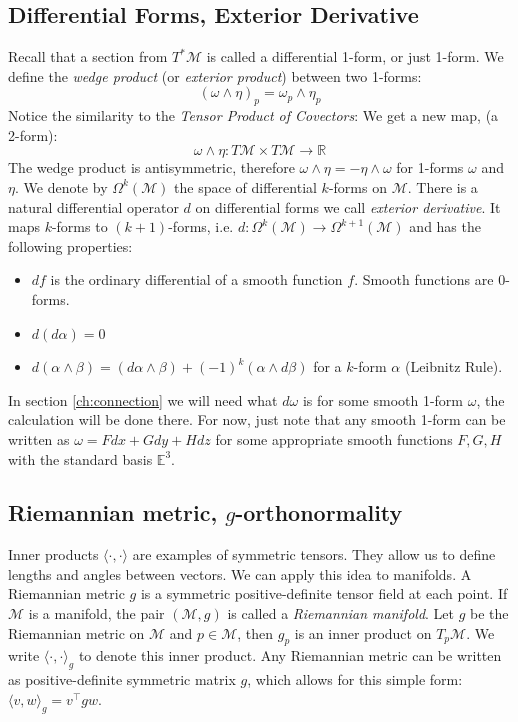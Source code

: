 \documentclass[../thesis.tex]{subfiles}
\begin{document}
\subsection{Differential Forms, Exterior Derivative}
Recall that a section from $T^*\mathcal{M}$ is called a differential 1-form, or just 1-form.
We define the \emph{wedge product} (or \emph{exterior product}) between two 1-forms:
$$(\omega \wedge \eta)_p = \omega_p \wedge \eta_p$$
Notice the similarity to the \emph{Tensor Product of Covectors}: We get a new map, (a 2-form):
$$\omega \wedge \eta: T\mathcal{M} \times T\mathcal{M} \to \mathbb{R}$$
The wedge product is antisymmetric, therefore $\omega \wedge \eta = -\eta \wedge \omega$ for 1-forms $\omega$ and $\eta$.
We denote by $\Omega^k(\mathcal{M})$ the space of differential $k$-forms on $\mathcal{M}$.
There is a natural differential operator $d$ on differential forms we call \emph{exterior derivative}.
It maps $k$-forms to $(k+1)$-forms, i.e. $d: \Omega^k(\mathcal{M}) \to \Omega^{k+1}(\mathcal{M})$
and has the following properties:
\begin{itemize}
  \item $df$ is the ordinary differential of a smooth function $f$. Smooth functions are 0-forms.
  \item $d(d\alpha) = 0$
  \item $d(\alpha \wedge \beta) = (d\alpha \wedge \beta) + (-1)^k(\alpha \wedge d\beta)$ for a $k$-form $\alpha$ (Leibnitz Rule).
\end{itemize}
In section \ref{ch:connection} we will need what $d\omega$ is for some smooth 1-form $\omega$, the calculation
will be done there. For now, just note that 
any smooth 1-form can be written as $\omega = Fdx+Gdy+Hdz$ for some appropriate smooth functions $F,G,H$
with the standard basis $\mathbb{E}^3$.


\subsection{Riemannian metric, $g$-orthonormality}
Inner products $\langle \cdot , \cdot \rangle$ are examples of symmetric tensors. They allow us to define lengths and angles
between vectors. We can apply this idea to manifolds.
A Riemannian metric $g$ is a symmetric positive-definite tensor field at each point.
If $\mathcal{M}$ is a manifold, the pair $(\mathcal{M},g)$ is called a \emph{Riemannian manifold}.
Let $g$ be the Riemannian metric on $\mathcal{M}$ and $p\in \mathcal{M}$,
then $g_p$ is an inner product on $T_p\mathcal{M}$. We write $\langle \cdot, \cdot\rangle_g$ to denote this inner product.
Any Riemannian metric can be written as positive-definite symmetric matrix $g$, which allows for this simple form: $\langle v,w\rangle_g = v^{\top}gw$.
\end{document}
